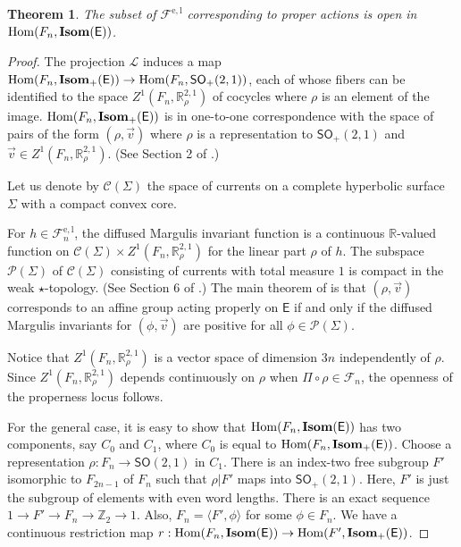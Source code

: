 \documentclass{amsart}
\numberwithin{equation}{section}
\newcommand\bR{{\mathbb{R}}}
\newcommand\bZ{{\mathbb Z}}
\newcommand\Hom{{\rm Hom}}
\newcommand\ra{\rightarrow}
\newcommand\Isom{{\mathbf{Isom}}}
\newcommand\SO{{\mathsf{SO}}}
\newcommand\Lspace{\mathsf E}
\newtheorem{theorem}{Theorem}[section]
\theoremstyle{definition}
\theoremstyle{remark}
\newcommand{\romel}{{\mathrm{e}, \mathrm{l}}}
\begin{document}
\begin{theorem} \label{thm:nonpara}
The subset 
of $\mathcal{F}^{\romel}$ corresponding to proper actions is open 
in $\Hom(F_n, \Isom(\Lspace))$. 
\end{theorem} 
\begin{proof} 
The projection $\mathcal{L}$ induces 
a map $\Hom(F_n, \Isom_+(\Lspace)) \ra \Hom(F_n, \SO_+(2, 1))$, 
each of whose fibers can be identified to 
the space $Z^1(F_n, \bR^{2, 1}_\rho)$ of cocycles where $\rho$ 
is an element of the image. 
$\Hom(F_n, \Isom_+(\Lspace))$ is 
in one-to-one correspondence with the space of pairs of the form 
$(\rho, \vec{v})$ where 
$\rho$ is a representation to $\SO_+(2, 1)$ and 
$\vec{v} \in Z^1(F_n, \bR^{2, 1}_\rho)$. 
(See Section 2 of \cite{GLM09}.) 

Let us denote by $\mathcal{C}(\Sigma)$ the space of currents on a complete hyperbolic surface $\Sigma$ with a compact convex core.

For $h \in \mathcal{F}^{\romel}_n$, 
the diffused Margulis invariant function is a continuous 
$\bR$-valued function on
$\mathcal{C}(\Sigma)\times Z^1(F_n, \bR^{2,1}_{\rho})$
for the linear part $\rho$ of $h$.  
The subspace $\mathcal{P}(\Sigma)$ of $\mathcal{C}(\Sigma)$ consisting 
of currents with total measure $1$ is compact in the weak $\star$-topology. 
(See Section 6 of \cite{GLM09}.) 
The main theorem of \cite{GLM09} is that 
$(\rho, \vec{v})$ corresponds to an affine group acting properly on $\Lspace$ 
if and only if the diffused Margulis invariants for $(\phi, \vec{v})$ are positive for all 
$\phi \in \mathcal{P}(\Sigma)$. 

Notice that $Z^1(F_n, \bR^{2, 1}_\rho)$ is a vector space of dimension 
$3n$ independently of $\rho$. 
Since $Z^1(F_n, \bR^{2, 1}_\rho)$ depends continuously on 
$\rho$ when $\Pi\circ \rho \in \mathcal{F}_n$, the openness of the properness locus follows. 

For the general case, 
it is easy to show that $\Hom(F_n, \Isom(\Lspace))$ has two components, 
say $C_0$ and $C_1$, where $C_0$ is 
equal to $\Hom(F_n, \Isom_+(\Lspace))$.
Choose a representation $\rho: F_n \ra \SO(2, 1)$ in $C_1$. 
There is an index-two free subgroup $F'$ isomorphic to $F_{2n-1}$ of $F_n$ such that 
$\rho| F'$ maps into $\SO_+(2, 1)$. Here, 
$F'$ is just the subgroup of elements with even word lengths. 
There is an exact sequence $1 \ra F' \ra F_n \ra \bZ_2 \ra 1$. 
Also, $F_n = \langle F', \phi\rangle$ for some $\phi \in F_n$. 
We have a continuous restriction map 
$r:\Hom(F_n, \Isom(\Lspace)) \ra \Hom(F', \Isom_+(\Lspace))$. 


\end{proof}
\end{document}
